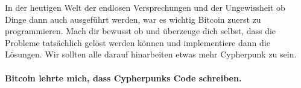 In der heutigen Welt der endlosen Versprechungen und der Ungewissheit ob Dinge
dann auch ausgeführt werden, war es wichtig Bitcoin zuerst zu programmieren.
Mach dir bewusst ob und überzeuge dich selbst, dass die Probleme tatsächlich
gelöst werden können und implementiere dann die Lösungen. Wir sollten alle
darauf hinarbeiten etwas mehr Cypherpunk zu sein.

\paragraph{Bitcoin lehrte mich, dass Cypherpunks Code schreiben.}

%
%
%
%
